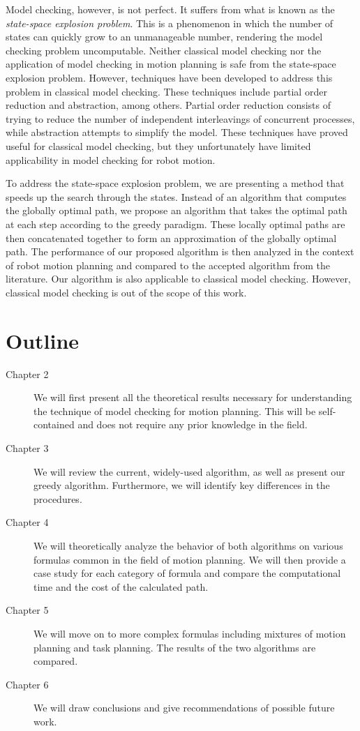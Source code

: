 Model checking, however, is not perfect. It suffers from what is known as the \textit{state-space explosion problem}. This is a phenomenon in which the number of states can quickly grow to an unmanageable number, rendering the model checking problem uncomputable. Neither classical model checking nor the application of model checking in motion planning is safe from the state-space explosion problem. However, techniques have been developed to address this problem in classical model checking. These techniques include partial order reduction and abstraction, among others. Partial order reduction consists of trying to reduce the number of independent interleavings of concurrent processes, while abstraction attempts to simplify the model. These techniques have proved useful for classical model checking, but they unfortunately have limited applicability in model checking for robot motion.  


To address the state-space explosion problem, we are presenting a method that speeds up the search through the states. Instead of an algorithm that computes the globally optimal path, we propose an algorithm that takes the optimal path at each step according to the greedy paradigm. These locally optimal paths are then concatenated together to form an approximation of the globally optimal path. The performance of our proposed algorithm is then analyzed in the context of robot motion planning and compared to the accepted algorithm from the literature. Our algorithm is also applicable to classical model checking. However, classical model checking is out of the scope of this work. 

\section{Outline}
\begin{description}
    \item[Chapter 2] We will first present all the theoretical results necessary for understanding the technique of model checking for motion planning. This will be self-contained and does not require any prior knowledge in the field.
    \item[Chapter 3] We will review the current, widely-used algorithm, as well as present our greedy algorithm. Furthermore, we will identify key differences in the procedures.
    \item[Chapter 4] We will theoretically analyze the behavior of both algorithms on various formulas common in the field of motion planning. We will then provide a case study for each category of formula and compare the computational time and the cost of the calculated path.
    \item[Chapter 5] We will move on to more complex formulas including mixtures of motion planning and task planning. The results of the two algorithms are compared. 
    \item[Chapter 6] We will draw conclusions and give recommendations of possible future work.
\end{description}
